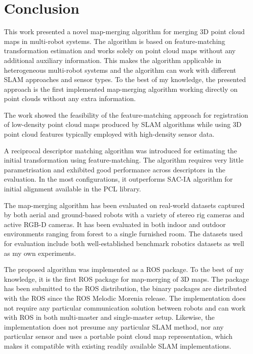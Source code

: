 \chapter*{Conclusion}

This work presented a novel map-merging algorithm for merging \gls{3D} point cloud maps in multi-robot systems. The algorithm is based on feature-matching transformation estimation and works solely on point cloud maps without any additional auxiliary information. This makes the algorithm applicable in heterogeneous multi-robot systems and the algorithm can work with different \gls{SLAM} approaches and sensor types. To the best of my knowledge, the presented approach is the first implemented map-merging algorithm working directly on point clouds without any extra information.

The work showed the feasibility of the feature-matching approach for registration of low-density point cloud maps produced by \gls{SLAM} algorithms while using \gls{3D} point cloud features typically employed with high-density sensor data.

A reciprocal descriptor matching algorithm was introduced for estimating the initial transformation using feature-matching. The algorithm requires very little parametrisation and exhibited good performance across descriptors in the evaluation. In the most configurations, it outperforms \gls{SAC-IA} algorithm for initial alignment available in the \gls{PCL} library.

The map-merging algorithm has been evaluated on real-world datasets captured by both aerial and ground-based robots with a variety of stereo rig cameras and active \gls{RGB-D} cameras. It has been evaluated in both indoor and outdoor environments ranging from forest to a single furnished room. The datasets used for evaluation include both well-established benchmark robotics datasets as well as my own experiments.

The proposed algorithm was implemented as a \gls{ROS} package. To the best of my knowledge, it is the first \gls{ROS} package for map-merging of \gls{3D} maps. The package has been submitted to the \gls{ROS} distribution, the binary packages are distributed with the \gls{ROS} since the \gls{ROS} Melodic Morenia release. The implementation does not require any particular communication solution between robots and can work with \gls{ROS} in both multi-master and single-master setup. Likewise, the implementation does not presume any particular \gls{SLAM} method, nor any particular sensor and uses a portable point cloud map representation, which makes it compatible with existing readily available \gls{SLAM} implementations.

